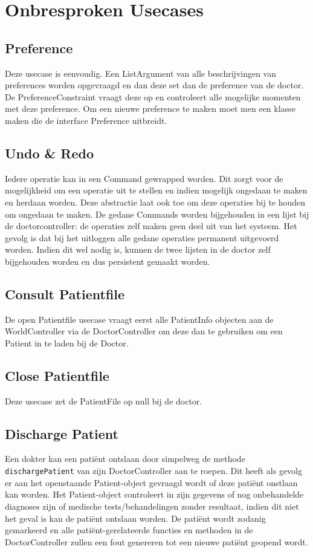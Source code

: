 \documentclass[a4paper]{article}
\begin{document}
\section{Onbresproken Usecases}
\subsection{Preference}
Deze usecase is eenvoudig. Een ListArgument van alle beschrijvingen van preferences worden opgevraagd en dan deze set dan de preference van de doctor. De PreferenceConstraint vraagt deze op en controleert alle mogelijke momenten met deze preference. Om een nieuwe preference te maken moet men een klasse maken die de interface Preference uitbreidt.

\subsection{Undo \& Redo}
Iedere operatie kan in een Command gewrapped worden. Dit zorgt voor de mogelijkheid om een operatie uit te stellen en indien mogelijk ongedaan te maken en herdaan worden. Deze abstractie laat ook toe om deze operaties bij te houden om ongedaan te maken. De gedane Commands worden bijgehouden in een lijst bij de doctorcontroller: de operaties zelf maken geen deel uit van het systeem. Het gevolg is dat bij het uitloggen alle gedane operaties permanent uitgevoerd worden. Indien dit wel nodig is, kunnen de twee lijsten in de doctor zelf bijgehouden worden en dus persistent gemaakt worden.

\subsection{Consult Patientfile}
De open Patientfile usecase vraagt eerst alle PatientInfo objecten aan de WorldController via de DoctorController om deze dan te gebruiken om een Patient in te laden bij de Doctor.

\subsection{Close Patientfile}
Deze usecase zet de PatientFile op null bij de doctor.

\subsection{Discharge Patient}
Een dokter kan een pati\"ent ontslaan door simpelweg de methode \texttt{dischargePatient} van zijn DoctorController aan te roepen. Dit heeft als gevolg er aan het openstaande Patient-object gevraagd wordt of deze pati\"ent onstlaan kan worden. Het Patient-object controleert in zijn gegevens of nog onbehandelde diagnoses zijn of medische tests/behandelingen zonder resultaat, indien dit niet het geval is kan de pati\"ent ontslaan worden.
De pati\"ent wordt zodanig gemarkeerd en alle pati\"ent-gerelateerde functies en methoden in de DoctorController zullen een fout genereren tot een nieuwe pati\"ent geopend wordt.
\end{document}
